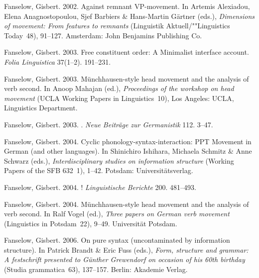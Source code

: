 \begin{thebibliography}{1420}
Fanselow, Gisbert. 2002.
\newblock Against remnant {VP}-movement.
\newblock In Artemis Alexiadou, Elena Anagnostopoulou, Sjef Barbiers \&
  Hans-Martin G{\"a}rtner (eds.), \emph{Dimensions of movement: {From} features
  to remnants} (Linguistik Aktuell/""Linguistics Today~48), 91--127. Amsterdam:
  John Benjamins Publishing Co.

Fanselow, Gisbert. 2003{}.
\newblock Free constituent order: {A} {Minimalist} interface account.
\newblock \emph{Folia Linguistica} 37(1--2). 191--231.

Fanselow, Gisbert. 2003{}.
\newblock M{\"u}nchhausen-style head movement and the analysis of verb second.
\newblock In Anoop Mahajan (ed.), \emph{Proceedings of the workshop on head
  movement} (UCLA Working Papers in Linguistics~10), Los Angeles: UCLA,
  Linguistics Department.

Fanselow, Gisbert. 2003{}.
.
\newblock \emph{Neue Beitr{\"a}ge zur Germanistik} 112. 3--47.

Fanselow, Gisbert. 2004{}.
\newblock Cyclic phonology-syntax-interaction: {PPT Movement} in {German} (and
  other languages).
\newblock In Shinichiro Ishihara, Michaela Schmitz \& Anne Schwarz (eds.),
  \emph{Interdisciplinary studies on information structure} (Working Papers of
  the SFB 632~1), 1--42. Potsdam: Universit{\"a}tsverlag.

Fanselow, Gisbert. 2004{}.
!
\newblock \emph{Linguistische Berichte} 200. 481--493.

Fanselow, Gisbert. 2004{}.
\newblock M{\"u}nchhausen-style head movement and the analysis of verb second.
\newblock In Ralf Vogel (ed.), \emph{Three papers on {German} verb movement}
  (Linguistics in Potsdam~22), 9--49. Uni\-ver\-si\-t{\"a}t Potsdam.

Fanselow, Gisbert. 2006.
\newblock On pure syntax (uncontaminated by information structure).
\newblock In Patrick Brandt \& Eric Fuss (eds.), \emph{Form, structure and
  grammar: {A} festschrift presented to {G{\"u}nther Grewendorf} on occasion of
  his 60th birthday} (Studia grammatica~63), 137--157. Berlin: Akademie Verlag.


\end{thebibliography}

